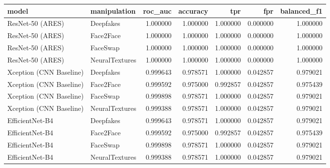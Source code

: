 \begin{tabular}{llrrrrr}
\toprule
model & manipulation & roc_auc & accuracy & tpr & fpr & balanced_f1 \\
\midrule
ResNet-50 (ARES) & Deepfakes & 1.000000 & 1.000000 & 1.000000 & 0.000000 & 1.000000 \\
ResNet-50 (ARES) & Face2Face & 1.000000 & 1.000000 & 1.000000 & 0.000000 & 1.000000 \\
ResNet-50 (ARES) & FaceSwap & 1.000000 & 1.000000 & 1.000000 & 0.000000 & 1.000000 \\
ResNet-50 (ARES) & NeuralTextures & 1.000000 & 1.000000 & 1.000000 & 0.000000 & 1.000000 \\
Xception (CNN Baseline) & Deepfakes & 0.999643 & 0.978571 & 1.000000 & 0.042857 & 0.979021 \\
Xception (CNN Baseline) & Face2Face & 0.999592 & 0.975000 & 0.992857 & 0.042857 & 0.975439 \\
Xception (CNN Baseline) & FaceSwap & 0.999898 & 0.978571 & 1.000000 & 0.042857 & 0.979021 \\
Xception (CNN Baseline) & NeuralTextures & 0.999388 & 0.978571 & 1.000000 & 0.042857 & 0.979021 \\
EfficientNet-B4 & Deepfakes & 0.999643 & 0.978571 & 1.000000 & 0.042857 & 0.979021 \\
EfficientNet-B4 & Face2Face & 0.999592 & 0.975000 & 0.992857 & 0.042857 & 0.975439 \\
EfficientNet-B4 & FaceSwap & 0.999898 & 0.978571 & 1.000000 & 0.042857 & 0.979021 \\
EfficientNet-B4 & NeuralTextures & 0.999388 & 0.978571 & 1.000000 & 0.042857 & 0.979021 \\
\bottomrule
\end{tabular}

